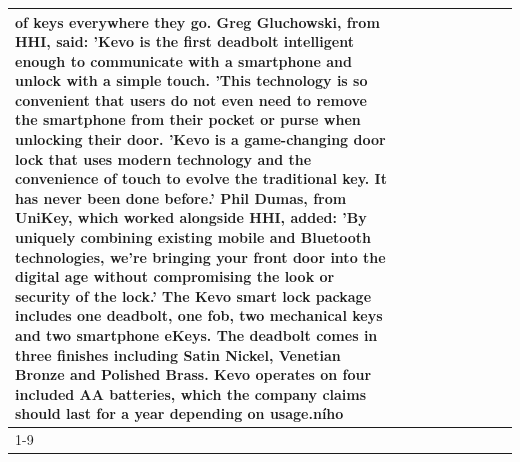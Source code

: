 \begin{table}[H]
\begin{tabular}{lllrlllll}
of keys everywhere they go. Greg Gluchowski, from HHI, said: 'Kevo is the first deadbolt intelligent enough to communicate with a smartphone and unlock with a simple touch. 'This technology is so convenient that users do not even need to remove the smartphone from their pocket or purse when unlocking their door. 'Kevo is a game-changing door lock that uses modern technology and the convenience of touch to evolve the traditional key. It has never been done before.' Phil Dumas, from UniKey, which worked alongside HHI, added: 'By uniquely combining existing mobile and Bluetooth technologies, we’re bringing your front door into the digital age without compromising the look or security of the lock.' The Kevo smart lock package includes one deadbolt, one fob, two mechanical keys and two smartphone eKeys. The deadbolt comes in three finishes including Satin Nickel, Venetian Bronze and Polished Brass. Kevo operates on four included AA batteries, which the company claims should last for a year depending on usage.ního \\
\cline{1-9}

\end{tabular}
\end{table}
